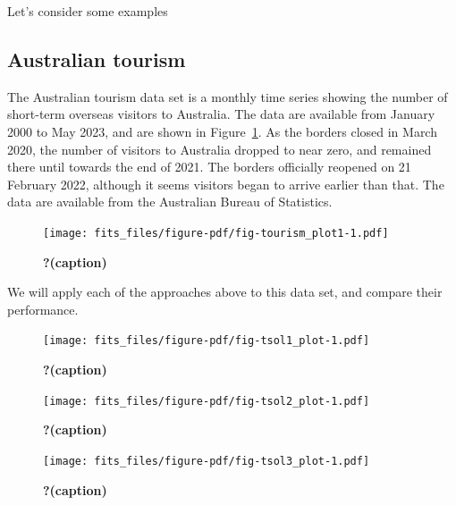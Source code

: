 \documentclass[11pt,a4paper,]{article}
\begin{document}
Let's consider some examples

\hypertarget{australian-tourism}{%
\subsection{Australian tourism}\label{australian-tourism}}

The Australian tourism data set is a monthly time series showing the
number of short-term overseas visitors to Australia. The data are
available from January 2000 to May 2023, and are shown in
Figure~\ref{fig-tourism_plot1}. As the borders closed in March 2020, the
number of visitors to Australia dropped to near zero, and remained there
until towards the end of 2021. The borders officially reopened on 21
February 2022, although it seems visitors began to arrive earlier than
that. The data are available from the Australian Bureau of Statistics.

\begin{figure}

{\centering \texttt{[image: fits\_files/figure-pdf/fig-tourism\_plot1-1.pdf]}

}

\caption{\label{fig-tourism_plot1}\textbf{?(caption)}}

\end{figure}

We will apply each of the approaches above to this data set, and compare
their performance.

\begin{figure}

{\centering \texttt{[image: fits\_files/figure-pdf/fig-tsol1\_plot-1.pdf]}

}

\caption{\label{fig-tsol1_plot}\textbf{?(caption)}}

\end{figure}

\begin{figure}

{\centering \texttt{[image: fits\_files/figure-pdf/fig-tsol2\_plot-1.pdf]}

}

\caption{\label{fig-tsol2_plot}\textbf{?(caption)}}

\end{figure}

\begin{figure}

{\centering \texttt{[image: fits\_files/figure-pdf/fig-tsol3\_plot-1.pdf]}

}

\caption{\label{fig-tsol3_plot}\textbf{?(caption)}}

\end{figure}
\end{document}
